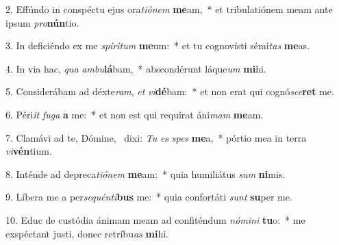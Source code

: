 2. Effúndo in conspéctu ejus ora\textit{ti}\textit{ó}\textit{nem} \textbf{me}am,~*  et tribulatiónem meam ante ipsum \textit{pro}\textbf{nún}tio.\

3. In deficiéndo ex me \textit{spí}\textit{ri}\textit{tum} \textbf{me}um:~*  et tu cognovísti sémi\textit{tas} \textbf{me}as.\

4. In via hac, \textit{qua} \textit{am}\textit{bu}\textbf{lá}bam,~*  abscondérunt láque\textit{um} \textbf{mi}hi.\

5. Considerábam ad déxte\textit{ram}, \textit{et} \textit{vi}\textbf{dé}bam:~*  et non erat qui cognó\textit{sce}\textbf{ret} me.\

6. Péri\textit{it} \textit{fu}\textit{ga} \textbf{a} me:~*  et non est qui requírat áni\textit{mam} \textbf{me}am.\

7. Clamávi ad te, Dómine, \dag\  dixi: \textit{Tu} \textit{es} \textit{spes} \textbf{me}a,~*  pórtio mea in terra \textit{vi}\textbf{vén}tium.\

8. Inténde ad depreca\textit{ti}\textit{ó}\textit{nem} \textbf{me}am:~*  quia humiliátus \textit{sum} \textbf{ni}mis.\

9. Líbera me a per\textit{se}\textit{quén}\textit{ti}\textbf{bus} me:~*  quia confortáti \textit{sunt} \textbf{su}per me.\

10. Educ de custódia ánimam meam ad confiténdum \textit{nó}\textit{mi}\textit{ni} \textbf{tu}o:~*  me exspéctant justi, donec retríbu\textit{as} \textbf{mi}hi.\

